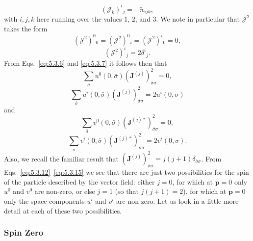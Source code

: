 \begin{equation}
  (\mathcal{J}_k)^i{}_j=-\ii\epsilon_{ijk},
  \tag{5.3.9}\label{eq:5.3.9}
\end{equation}
with $i,j,k$ here running over the values 1, 2, and 3. We note in particular
that $\boldsymbol{\mathcal{J}}^2$ takes the form
\begin{equation}
  (\boldsymbol{\mathcal{J}}^2)^0{}_0
  =(\boldsymbol{\mathcal{J}}^2)^0{}_i
  =(\boldsymbol{\mathcal{J}}^2)^i{}_0=0,
  \tag{5.3.10}\label{eq:5.3.10}
\end{equation}
\begin{equation}
  (\boldsymbol{\mathcal{J}}^2)^i{}_j=2\delta^i{}_j.
  \tag{5.3.11}\label{eq:5.3.11}
\end{equation}
From Eqs.~\eqref{eq:5.3.6} and \eqref{eq:5.3.7} it follows then that
\begin{equation}
  \sum_{\bar\sigma}u^0(0,\bar\sigma)
  (\mathbf{J}^{(j)})^2_{\bar\sigma\sigma}=0,
  \tag{5.3.12}\label{eq:5.3.12}
\end{equation}
\begin{equation}
  \sum_{\bar\sigma}u^i(0,\bar\sigma)
  (\mathbf{J}^{(j)})^2_{\bar\sigma\sigma}=2u^i(0,\sigma)
  \tag{5.3.13}\label{eq:5.3.13}
\end{equation}
and
\begin{equation}
  \sum_{\bar\sigma}v^0(0,\bar\sigma)
  (\mathbf{J}^{(j)*})^2_{\bar\sigma\sigma}=0,
  \tag{5.3.14}\label{eq:5.3.14}
\end{equation}
\begin{equation}
  \sum_{\bar\sigma}v^i(0,\bar\sigma)
  (\mathbf{J}^{(j)*})^2_{\bar\sigma\sigma}=2v^i(0,\sigma).
  \tag{5.3.15}\label{eq:5.3.15}
\end{equation}
Also, we recall the familiar result that
$(\mathbf{J}^{(j)})^2_{\bar\sigma\sigma}=j(j+1)\delta_{\bar\sigma\sigma}$.
From Eqs.~\eqref{eq:5.3.12}--\eqref{eq:5.3.15} we see that there are just two possibilities for
the spin of the particle described by the vector field: either $j=0$, for
which at $\mathbf{p}=0$ only $u^0$ and $v^0$ are non-zero, or else $j=1$
(so that $j(j+1)=2$), for which at $\mathbf{p}=0$ only the space-components
$u^i$ and $v^i$ are non-zero. Let us look in a little more detail at each of
these two possibilities.

\subsubsection*{Spin Zero}

